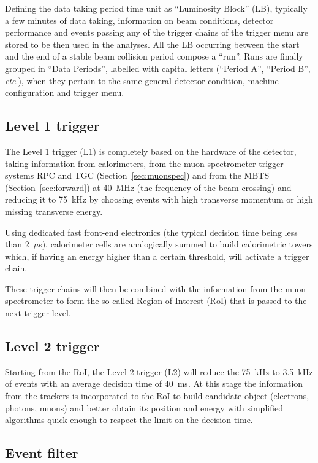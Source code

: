 Defining the data taking period time unit as ``Luminosity Block'' (LB), typically
a few minutes of  data taking, information on beam conditions, detector performance 
and events passing any of the trigger chains of the trigger menu are stored
to be then used in the analyses. All the LB occurring between the start and the
end of a stable beam collision period compose a ``run''. Runs are finally grouped
in ``Data Periods'', labelled with capital letters (``Period A'', ``Period B'', {\it etc}.),
when they pertain to the same general detector condition, machine configuration and
trigger menu.




\subsection{Level 1 trigger}\label{sec:lvl1}

The Level 1 trigger (L1) is completely based on the hardware of the detector,
taking information from calorimeters, from the muon spectrometer trigger
systems RPC and TGC (Section~\ref{sec:muonspec}) and from the MBTS (Section~\ref{sec:forward}) 
at 40~MHz (the frequency of the beam crossing) and reducing it to 75~kHz by choosing events with high
transverse momentum or high missing transverse energy.

Using dedicated fast front-end electronics (the typical decision time being less than
2~$\mu$s), calorimeter cells are analogically 
summed to build calorimetric towers which, if having an energy higher than a 
certain threshold, will activate a trigger chain.

These trigger chains will then be combined with the information from the
muon spectrometer to form the so-called Region of Interest (RoI) that is
passed to the next trigger level.


\subsection{Level 2 trigger}\label{sec:lvl2}

Starting from the RoI, the Level 2 trigger (L2) will reduce the 75~kHz to
3.5~kHz of events with an average decision time of 40~ms. At this
stage the information from the trackers is incorporated to the RoI
to build candidate object (electrons, photons, muons) and 
better obtain its position and energy with simplified algorithms
quick enough to respect the limit on the decision time.

\subsection{Event filter}\label{sec:lvl3}

